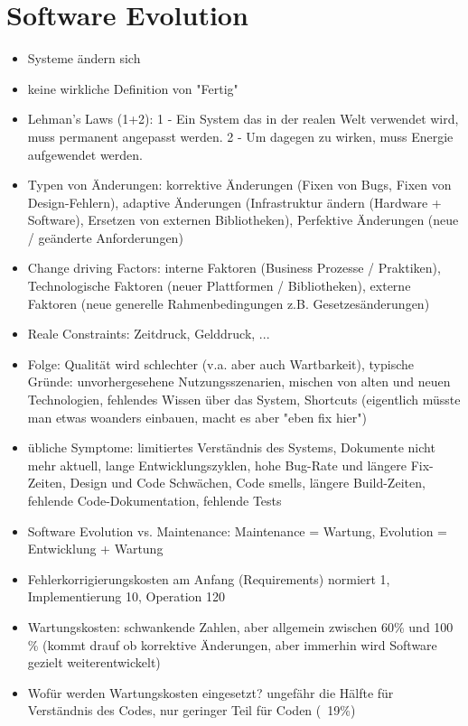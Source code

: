 \documentclass[paper=a4, fontsize=11pt]{scrartcl} %
\numberwithin{equation}{section} %
\numberwithin{figure}{section} %
\numberwithin{table}{section} %
\begin{document}
\section{Software Evolution}

\begin{itemize}
  \item Systeme ändern sich
  \item keine wirkliche Definition von "Fertig"
  \item Lehman's Laws (1+2): 1 - Ein System das in der realen Welt verwendet wird, muss permanent angepasst werden. 2 - Um dagegen zu wirken, muss Energie aufgewendet werden.
  \item Typen von Änderungen: korrektive Änderungen (Fixen von Bugs, Fixen von Design-Fehlern), adaptive Änderungen (Infrastruktur ändern (Hardware + Software), Ersetzen von externen Bibliotheken), Perfektive Änderungen (neue / geänderte Anforderungen)
  \item Change driving Factors: interne Faktoren (Business Prozesse / Praktiken), Technologische Faktoren (neuer Plattformen / Bibliotheken), externe Faktoren (neue generelle Rahmenbedingungen z.B. Gesetzesänderungen)
  \item Reale Constraints: Zeitdruck, Gelddruck, ...
  \item Folge: Qualität wird schlechter (v.a. aber auch Wartbarkeit), typische Gründe: unvorhergesehene Nutzungsszenarien, mischen von alten und neuen Technologien, fehlendes Wissen über das System, Shortcuts (eigentlich müsste man etwas woanders einbauen, macht es aber "eben fix hier")
  \item übliche Symptome: limitiertes Verständnis des Systems, Dokumente nicht mehr aktuell, lange Entwicklungszyklen, hohe Bug-Rate und längere Fix-Zeiten, Design und Code Schwächen, Code smells, längere Build-Zeiten, fehlende Code-Dokumentation, fehlende Tests
  \item Software Evolution vs. Maintenance: Maintenance = Wartung, Evolution = Entwicklung + Wartung
  \item Fehlerkorrigierungskosten am Anfang (Requirements) normiert 1, Implementierung 10, Operation 120
  \item Wartungskosten: schwankende Zahlen, aber allgemein zwischen 60\% und 100 \% (kommt drauf ob korrektive Änderungen, aber immerhin wird Software gezielt weiterentwickelt)
  \item Wofür werden Wartungskosten eingesetzt? ungefähr die Hälfte für Verständnis des Codes, nur geringer Teil für Coden (~19\%)

\end{itemize}
\end{document}
